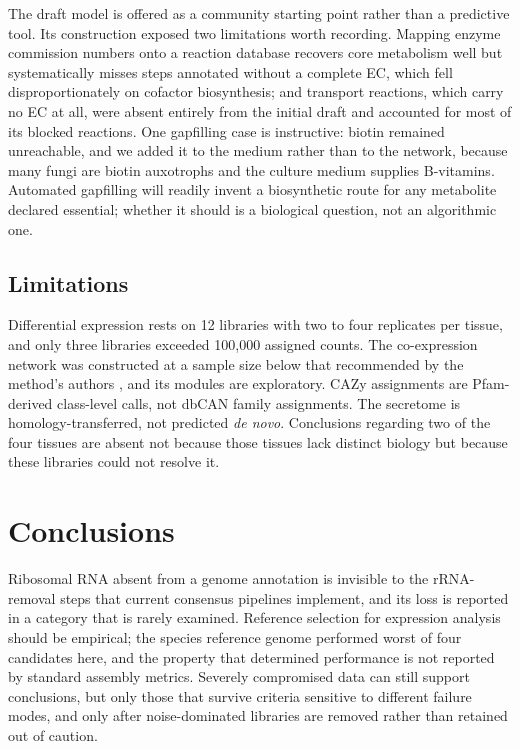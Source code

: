 The draft model is offered as a community starting point rather than a predictive tool. Its
construction exposed two limitations worth recording. Mapping enzyme commission numbers onto a
reaction database recovers core metabolism well but systematically misses steps annotated
without a complete EC, which fell disproportionately on cofactor biosynthesis; and transport
reactions, which carry no EC at all, were absent entirely from the initial draft and accounted
for most of its blocked reactions. One gapfilling case is instructive: biotin remained
unreachable, and we added it to the medium rather than to the network, because many fungi are
biotin auxotrophs and the culture medium supplies B-vitamins. Automated gapfilling will readily
invent a biosynthetic route for any metabolite declared essential; whether it should is a
biological question, not an algorithmic one.

\subsection{Limitations}

Differential expression rests on 12 libraries with two to four replicates per tissue, and only
three libraries exceeded 100,000 assigned counts. The co-expression network was constructed at
a sample size below that recommended by the method's authors \cite{langfelder2008wgcna}, and
its modules are exploratory. CAZy assignments are Pfam-derived class-level calls, not dbCAN
family assignments. The secretome is homology-transferred, not predicted \textit{de novo}.
Conclusions regarding two of the four tissues are absent not because those tissues lack
distinct biology but because these libraries could not resolve it.

\section{Conclusions}

Ribosomal RNA absent from a genome annotation is invisible to the rRNA-removal steps that
current consensus pipelines implement, and its loss is reported in a category that is rarely
examined. Reference selection for expression analysis should be empirical; the species
reference genome performed worst of four candidates here, and the property that determined
performance is not reported by standard assembly metrics. Severely compromised data can still
support conclusions, but only those that survive criteria sensitive to different failure modes,
and only after noise-dominated libraries are removed rather than retained out of caution.

